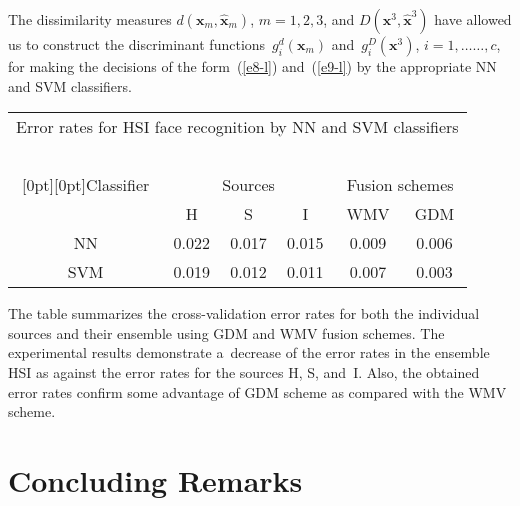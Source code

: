 \begin{multicols}{2}
The dissimilarity 
measures $d(\mathbf{x}_m, \hat{\mathbf{x}}_m)$, $m=1,2,3$, and 
$D(\mathbf{x}^3, \hat{\mathbf{x}}^3)$ have allowed us to construct the 
discriminant functions~$g_i^d(\mathbf{x}_m)$ and~$g_i^D(\mathbf{x}^3)$, 
$i=1, \ldots$\linebreak $\ldots , c$, for making the decisions of the form~(\ref{e8-l}) and~(\ref{e9-l}) 
by the appropriate NN and SVM classifiers.
{

}

\begin{table*}\small
\begin{center}
\tabcolsep=8pt
\begin{tabular}{cccccc}
\multicolumn{6}{c}{Error rates for HSI face recognition by NN and SVM classifiers}\\
\multicolumn{6}{c}{\ }\\[-6pt]
\hline
\multicolumn{1}{c}{\raisebox{-6pt}[0pt][0pt]{Classifier}}&
\multicolumn{3}{c}{Sources} &\multicolumn{2}{c}{Fusion schemes}\\ 
\cline{2-6} 
&H&S&I&\hspace*{2mm}WMV&GDM\\ 
\hline 
NN&0.022&0.017&0.015&\hspace*{2mm}0.009&0.006\\ 
SVM&0.019&0.012&0.011&\hspace*{2mm}0.007&0.003\\ 
\hline 
\end{tabular} 
\end{center} 
\vspace*{-12pt}
\end{table*}
The table summarizes the cross-validation error rates for both the individual sources 
and their ensemble using GDM and WMV fusion schemes. The experimental 
results demonstrate a~decrease of the error rates in the ensemble HSI as against the 
error rates for the sources H, S, and~I. Also, the obtained error rates confirm 
some advantage of GDM scheme as compared with the WMV scheme.
 
\vspace*{-9pt}

\section{Concluding Remarks}


\end{multicols}
